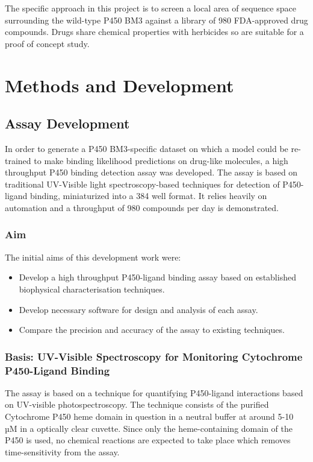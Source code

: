 \documentclass[16pt]{book}
\begin{document}
The specific approach in this project is to screen a local area of sequence space surrounding the wild-type P450 BM3 against a library of 980 FDA-approved drug compounds.
Drugs share chemical properties with herbicides so are suitable for a proof of concept study.

\section{Methods and Development}
\subsection{Assay Development}

In order to generate a P450 BM3-specific dataset on which a model could be re-trained to make binding likelihood predictions on drug-like molecules, a high throughput P450 binding detection assay was developed.
The assay is based on traditional UV-Visible light spectroscopy-based techniques for detection of P450-ligand binding, miniaturized into a 384 well format. 
It relies heavily on automation and a throughput of 980 compounds per day is demonstrated.

\subsubsection{Aim}

The initial aims of this development work were:

\begin{itemize}
	\item Develop a high throughput P450-ligand binding assay based on established biophysical characterisation techniques.
	\item Develop necessary software for design and analysis of each assay.
	\item Compare the precision and accuracy of the assay to existing techniques.
\end{itemize}

\subsubsection{Basis: UV-Visible Spectroscopy for Monitoring Cytochrome P450-Ligand Binding}

The assay is based on a technique for quantifying P450-ligand interactions based on UV-visible photospectroscopy.
The technique consists of the purified Cytochrome P450 heme domain in question in a neutral buffer at around 5-10 µM in a optically clear cuvette.
Since only the heme-containing domain of the P450 is used, no chemical reactions are expected to take place which removes time-sensitivity from the assay.
\par
\end{document}
